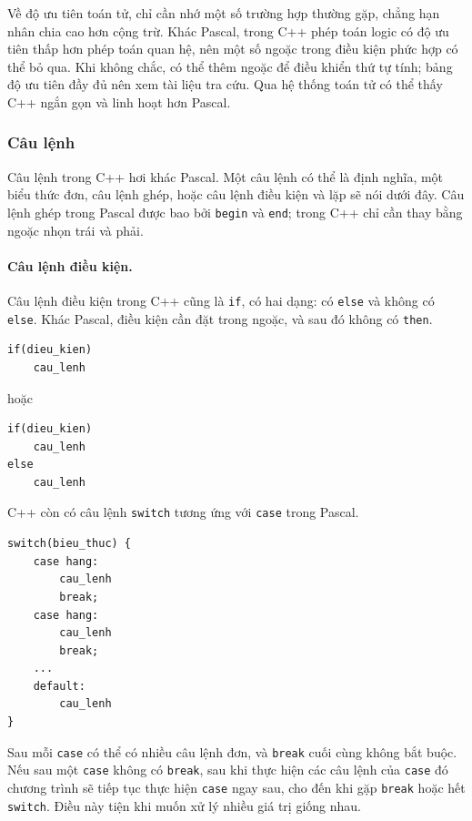 \documentclass[11pt]{article}
\newcommand{\cpp}{C++}
\newcommand{\pascal}{Pascal}
\begin{document}
Về độ ưu tiên toán tử, chỉ cần nhớ một số trường hợp thường gặp, chẳng hạn
nhân chia cao hơn cộng trừ. Khác \pascal{}, trong \cpp{} phép toán logic có độ
ưu tiên thấp hơn phép toán quan hệ, nên một số ngoặc trong điều kiện phức hợp
có thể bỏ qua. Khi không chắc, có thể thêm ngoặc để điều khiển thứ tự tính;
bảng độ ưu tiên đầy đủ nên xem tài liệu tra cứu. Qua hệ thống toán tử có thể
thấy \cpp{} ngắn gọn và linh hoạt hơn \pascal{}.

\subsubsection*{Câu lệnh}

Câu lệnh trong \cpp{} hơi khác \pascal{}. Một câu lệnh có thể là định nghĩa,
một biểu thức đơn, câu lệnh ghép, hoặc câu lệnh điều kiện và lặp sẽ nói dưới
đây. Câu lệnh ghép trong \pascal{} được bao bởi \verb|begin| và \verb|end|;
trong \cpp{} chỉ cần thay bằng ngoặc nhọn trái và phải.

\paragraph{Câu lệnh điều kiện.}
Câu lệnh điều kiện trong \cpp{} cũng là \verb|if|, có hai dạng: có
\verb|else| và không có \verb|else|. Khác \pascal{}, điều kiện cần đặt trong
ngoặc, và sau đó không có \verb|then|.

\begin{verbatim}
if(dieu_kien)
    cau_lenh
\end{verbatim}

hoặc

\begin{verbatim}
if(dieu_kien)
    cau_lenh
else
    cau_lenh
\end{verbatim}

\cpp{} còn có câu lệnh \verb|switch| tương ứng với \verb|case| trong
\pascal{}.

\begin{verbatim}
switch(bieu_thuc) {
    case hang:
        cau_lenh
        break;
    case hang:
        cau_lenh
        break;
    ...
    default:
        cau_lenh
}
\end{verbatim}

Sau mỗi \verb|case| có thể có nhiều câu lệnh đơn, và \verb|break| cuối cùng
không bắt buộc. Nếu sau một \verb|case| không có \verb|break|, sau khi thực
hiện các câu lệnh của \verb|case| đó chương trình sẽ tiếp tục thực hiện
\verb|case| ngay sau, cho đến khi gặp \verb|break| hoặc hết \verb|switch|.
Điều này tiện khi muốn xử lý nhiều giá trị giống nhau.
\end{document}
